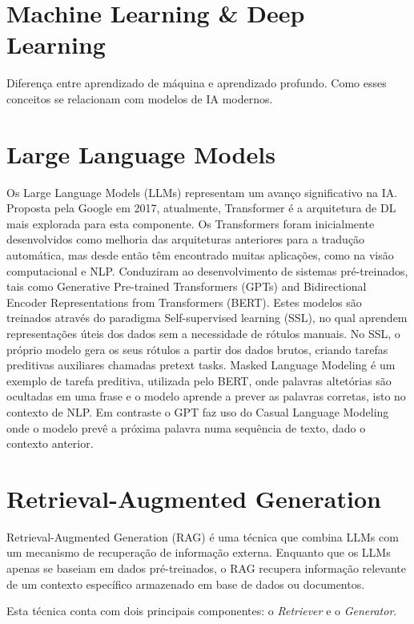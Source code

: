 \section{Machine Learning \& Deep Learning}

Diferença entre aprendizado de máquina e aprendizado profundo.
Como esses conceitos se relacionam com modelos de IA modernos.

\section{Large Language Models}

Os Large Language Models (LLMs) representam um avanço significativo na IA. Proposta pela Google em 2017, atualmente, Transformer é a arquitetura de DL mais explorada para esta componente. Os Transformers foram inicialmente desenvolvidos como melhoria das arquiteturas anteriores para a tradução automática, mas desde então têm encontrado muitas aplicações, como na visão computacional e NLP. Conduziram ao desenvolvimento de sistemas pré-treinados, tais como Generative Pre-trained Transformers (GPTs) and Bidirectional Encoder Representations from Transformers (BERT). Estes modelos são treinados através do paradigma Self-supervised learning (SSL), no qual aprendem representações úteis dos dados sem a necessidade de rótulos manuais. No SSL, o próprio modelo gera os seus rótulos a partir dos dados brutos, criando tarefas preditivas auxiliares chamadas pretext tasks. Masked Language Modeling é um exemplo de tarefa preditiva, utilizada pelo BERT, onde palavras altetórias são ocultadas em uma frase e o modelo aprende a prever as palavras corretas, isto no contexto de NLP. Em contraste o GPT faz uso do Casual Language Modeling onde o modelo prevê a próxima palavra numa sequência de texto, dado o contexto anterior.

\section{Retrieval-Augmented Generation}

Retrieval-Augmented Generation (RAG) é uma técnica que combina LLMs com um mecanismo de recuperação de informação externa. Enquanto que os LLMs apenas se baseiam em dados pré-treinados, o RAG recupera informação relevante de um contexto específico armazenado em base de dados ou documentos. 

Esta técnica conta com dois principais componentes: o  \textit{Retriever} e o  \textit{Generator}.

